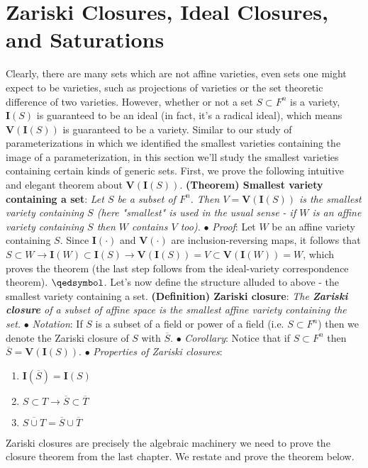 \documentclass{article}
\newcommand*{\tb}{\textbf}
\newcommand*{\ti}{\textit}
\newcommand*{\n}{\newline}
\newcommand*{\nn}{\newline \newline}
\newcommand*{\V}{\ensuremath{\mathbf{V}}}
\newcommand*{\I}{\ensuremath{\mathbf{I}}}
\begin{document}
\section{Zariski Closures, Ideal Closures, and Saturations}
Clearly, there are many sets which are not affine varieties, even sets one might expect to be varieties, such as projections of varieties or the set theoretic difference of two varieties. However, whether or not a set $ S \subset F^n $ is a variety, $ \I(S) $ is guaranteed to be an ideal (in fact, it's a radical ideal), which means $ \V(\I(S)) $ is guaranteed to be a variety. Similar to our study of parameterizations in which we identified the smallest varieties containing the image of a parameterization, in this section we'll study the smallest varieties containing certain kinds of generic sets. First, we prove the following intuitive and elegant theorem about $ \V(\I(S)) $.
\nn
\tb{(Theorem) Smallest variety containing a set}: \ti{Let $ S $ be a subset of $ F^n $. Then $ V = \V(\I(S)) $ is the smallest variety containing $ S $ (here "smallest" is used in the usual sense - if $ W $ is an affine variety containing $ S $ then $ W $ contains $ V $ too).}
\n
\indent $ \bullet $ \ti{Proof}: Let $ W $ be an affine variety containing $ S $. Since $ \I(\cdot) $ and $ \V(\cdot) $ are inclusion-reversing maps, it follows that $ S \subset W \rightarrow \I(W) \subset \I(S) \rightarrow \V(\I(S)) = V \subset \V(\I(W)) = W $, which proves the theorem (the last step follows from the ideal-variety correspondence theorem). $ \qedsymbol $.
\nn
Let's now define the structure alluded to above - the smallest variety containing a set.
\nn
\tb{(Definition) Zariski closure}: \ti{The \tb{Zariski closure} of a subset of affine space is the smallest affine variety containing the set.}
\n
\indent $ \bullet $ \ti{Notation}: If $ S $ is a subset of a field or power of a field (i.e. $ S \subset F^n $) then we denote the Zariski closure of $ S $ with $ \overline{S} $.
\n
\indent $ \bullet $ \ti{Corollary}: Notice that if $ S \subset F^n $ then $ \overline{S} = \V(\I(S)) $.
\n
\indent $ \bullet $ \ti{Properties of Zariski closures}:
\begin{enumerate}
    \item $ \I(\overline{S}) = \I(S) $
    \item $ S \subset T \rightarrow \overline{S} \subset \overline{T} $
    \item $ \overline{S \cup T} = \overline{S} \cup \overline{T} $
\end{enumerate}
Zariski closures are precisely the algebraic machinery we need to prove the closure theorem from the last chapter. We restate and prove the theorem below.
\end{document}
